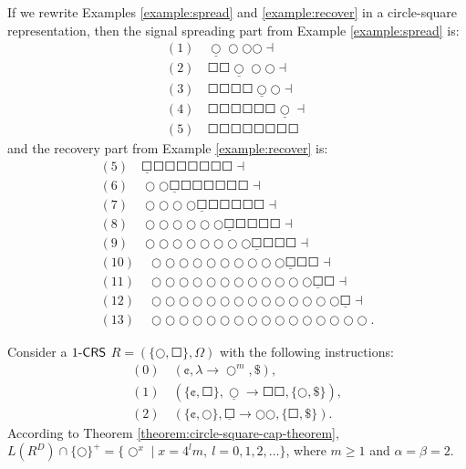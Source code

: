 \begin{example}
If we rewrite Examples \ref{example:spread} and \ref{example:recover} in a circle-square representation,
then the signal spreading part from Example \ref{example:spread} is:
$$
\begin{array}{l}
(1) \quad \underline{\Circle} \Circle \Circle \Circle \dashv\\
(2) \quad \Square \Square \underline{\Circle} \Circle \Circle \dashv\\
(3) \quad \Square \Square \Square \Square \underline{\Circle} \Circle \dashv\\
(4) \quad \Square \Square \Square \Square \Square \Square \underline{\Circle} \dashv\\
(5) \quad \Square \Square \Square \Square \Square \Square \Square \Square
\end{array}
$$
and the recovery part from Example \ref{example:recover} is:
$$
\begin{array}{l}
(5) \quad \underline{\Square} \Square \Square \Square \Square \Square \Square \Square \dashv\\
(6) \quad \Circle \Circle \underline{\Square} \Square \Square \Square \Square \Square \Square \dashv\\
(7) \quad \Circle \Circle \Circle \Circle \underline{\Square} \Square \Square \Square \Square \Square \dashv\\
(8) \quad \Circle \Circle \Circle \Circle \Circle \Circle \underline{\Square} \Square \Square \Square \Square \dashv\\
(9) \quad \Circle \Circle \Circle \Circle \Circle \Circle \Circle \Circle \underline{\Square} \Square \Square \Square \dashv\\
(10) \quad \Circle \Circle \Circle \Circle \Circle \Circle \Circle \Circle \Circle \Circle \underline{\Square} \Square \Square \dashv\\
(11) \quad \Circle \Circle \Circle \Circle \Circle \Circle \Circle \Circle \Circle \Circle \Circle \Circle \underline{\Square} \Square \dashv\\
(12) \quad \Circle \Circle \Circle \Circle \Circle \Circle \Circle \Circle \Circle \Circle \Circle \Circle \Circle \Circle \underline{\Square} \dashv\\
(13) \quad \Circle \Circle \Circle \Circle \Circle \Circle \Circle \Circle \Circle \Circle \Circle \Circle \Circle \Circle \Circle \Circle\;.
\end{array}
$$
\end{example}

Consider a $\kCRS[1]$ $R = (\{\Circle, \Square\}, \Omega)$ with the following instructions:
$$\begin{array}{l}
(0) \quad (\cent, \lambda \to \Circle^m, \$),\\
(1) \quad (\{\cent, \Square\}, \underline{\Circle} \to \Square \Square, \{\Circle, \$\}),\\
(2) \quad (\{\cent, \Circle\}, \underline{\Square} \to \Circle \Circle, \{\Square, \$\}).
\end{array}
$$
According to Theorem \ref{theorem:circle-square-cap-theorem}, $L(R^D) \cap \{\Circle\}^+ = \{\Circle^{x} \mid x = 4^l m, \ l = 0, 1, 2, \ldots\}$, where $m \ge 1$ and $\alpha = \beta = 2$.

